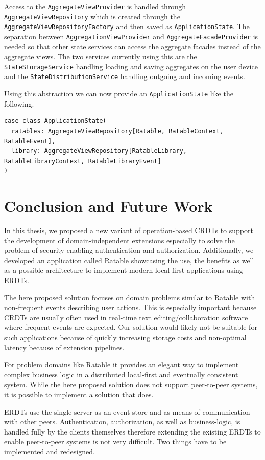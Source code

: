 \documentclass[
	english,
	ruledheaders=section,   %
	class=report,		    %
	thesis={type=bachelor}, %
	accentcolor=9c,			%
	custommargins=true,    %
	marginpar=false,        %
	parskip=half-,          %
	fontsize=11pt,          %
]{tudapub}
\begin{document}
Access to the \texttt{AggregateViewProvider} is handled through \texttt{AggregateViewRepository} which is created through the \texttt{AggregateViewRepositoryFactory} and then saved as \texttt{ApplicationState}. The separation between \texttt{AggregationViewProvider} and \texttt{AggregateFacadeProvider} is needed so that other state services can access the aggregate facades instead of the aggregate views. The two services currently using this are the \texttt{StateStorageService} handling loading and saving aggregates on the user device and the \texttt{StateDistributionService} handling outgoing and incoming events. 

Using this abstraction we can now provide an \texttt{ApplicationState} like the following.

\begin{lstlisting}
case class ApplicationState(
  ratables: AggregateViewRepository[Ratable, RatableContext, RatableEvent],
  library: AggregateViewRepository[RatableLibrary, RatableLibraryContext, RatableLibraryEvent]
)
\end{lstlisting}

\chapter{Conclusion and Future Work}
In this thesis, we proposed a new variant of operation-based CRDTs to support the development of domain-independent extensions especially to solve the problem of security enabling authentication and authorization. Additionally, we developed an application called Ratable showcasing the use, the benefits as well as a possible architecture to implement modern local-first applications using ERDTs.

The here proposed solution focuses on domain problems similar to Ratable with non-frequent events describing user actions. This is especially important because CRDTs are usually often used in real-time text editing/collaboration software where frequent events are expected. Our solution would likely not be suitable for such applications because of quickly increasing storage costs and non-optimal latency because of extension pipelines.

For problem domains like Ratable it provides an elegant way to implement complex business logic in a distributed local-first and eventually consistent system. While the here proposed solution does not support peer-to-peer systems, it is possible to implement a solution that does.

ERDTs use the single server as an event store and as means of communication with other peers. Authentication, authorization, as well as business-logic, is handled fully by the clients themselves therefore extending the existing ERDTs to enable peer-to-peer systems is not very difficult. Two things have to be implemented and redesigned.
\end{document}
